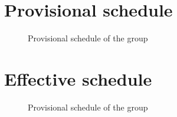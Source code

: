 
\newpage

\tableofcontents

\clearpage

\listoffigures
\clearpage



\clearpage


\clearpage
\section{Provisional schedule}

\begin{figure}[h]
		
		
		\caption{Provisional schedule of the group}
\end{figure}

\section{Effective schedule}

\begin{figure}[h]
		
		
		\caption{Provisional schedule of the group}
\end{figure}
